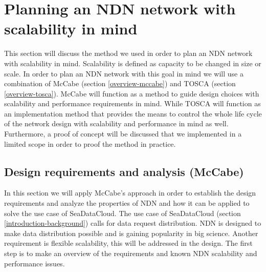 \section{Planning an NDN network with scalability in mind}
This section will discuss the method we used in order to plan an NDN network with scalability in mind. Scalability is defined as capacity to be changed in size or scale. In order to plan an NDN network with this goal in mind we will use a combination of McCabe (section \ref{overview-mccabe}) and TOSCA (section \ref{overview-tosca}). McCabe will function as a method to guide design choices with scalability and performance requirements in mind. While TOSCA will function as an implementation method that provides the means to control the whole life cycle of the network design with scalability and performance in mind as well. Furthermore, a proof of concept will be discussed that we implemented in a limited scope in order to proof the method in practice.

\subsection{Design requirements and analysis (McCabe)}
In this section we will apply McCabe's approach in order to establish the design requirements and analyze the properties of NDN and how it can be applied to solve the use case of SeaDataCloud. The use case of SeaDataCloud (section \ref{introduction-background}) calls for data request distribution. NDN is designed to make data distribution possible and is gaining popularity in big science. Another requirement is flexible scalability, this will be addressed in the design. The first step is to make an overview of the requirements and known NDN scalability and performance issues.

